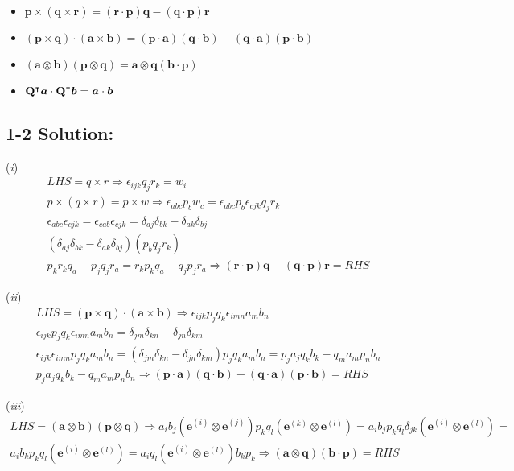 \begin{itemize}
    \item $\bm{p} \times (\bm{q} \times \bm{r}) = (\bm{r} \cdot \bm{p}) \bm{q} - (\bm{q} \cdot \bm{p}) \bm{r}$
    \item $(\bm{p} \times \bm{q}) \cdot (\bm{a} \times \bm{b}) = (\bm{p} \cdot \bm{a}) (\bm{q} \cdot \bm{b}) - (\bm{q} \cdot \bm{a})(\bm{p} \cdot \bm{b})$
    \item $(\bm{a} \otimes \bm{b})(\bm{p} \otimes \bm{q}) = \bm{a}\otimes\bm{q}(\bm{b} \cdot \bm{p}) $
    \item $\mathbf{Q}^\intercal\bm{a} \cdot \mathbf{Q}^\intercal\bm{b} = \bm{a}\cdot\bm{b} $
\end{itemize}

\subsection*{\textbf{1-2 Solution:}}
(\textit{i}) \begin{gather*}
    LHS =q\times r \Rightarrow \epsilon_{ijk}q_jr_k=w_i\\
    p\times(q\times r)=p\times w \Rightarrow\epsilon_{abc}p_bw_c=\epsilon_{abc}p_b\epsilon_{cjk}q_j r_k \\
    \epsilon_{abc}\epsilon_{cjk}=\epsilon_{cab}\epsilon_{cjk}=\delta_{aj}\delta_{bk}-\delta_{ak}\delta_{bj}\\
    (\delta_{aj}\delta_{bk}-\delta_{ak}\delta_{bj})(p_b q_j r_k)\\
    p_k r_k q_a - p_j q_j r_a = r_k p_k q_a - q_j p_j r_a \Rightarrow (\bm{r}\cdot\bm{p})\bm{q}-(\bm{q}\cdot\bm{p})\bm{r} = RHS
\end{gather*}

\medskip
(\textit{ii})\begin{gather*}
    LHS=(\bm{p} \times \bm{q}) \cdot (\bm{a} \times \bm{b})\Rightarrow\epsilon_{ijk}p_j q_k \epsilon_{imn}a_m b_n\\
    \epsilon_{ijk}p_j q_k \epsilon_{imn}a_m b_n=\delta_{jm}\delta_{kn}-\delta_{jn}\delta_{km}\\
    \epsilon_{ijk} \epsilon_{imn}p_j q_k a_m b_n=(\delta_{jm}\delta_{kn}-\delta_{jn}\delta_{km})p_j q_k a_m b_n=p_ja_jq_kb_k-q_ma_mp_nb_n\\
    p_ja_jq_kb_k-q_ma_mp_nb_n \Rightarrow (\bm{p} \cdot \bm{a}) (\bm{q} \cdot \bm{b}) - (\bm{q} \cdot \bm{a})(\bm{p} \cdot \bm{b})=RHS
\end{gather*}

\medskip
(\textit{iii})\begin{gather*}
    LHS = (\bm{a} \otimes \bm{b})(\bm{p} \otimes \bm{q}) \Rightarrow a_i b_j (\bm{e}^{(i)}\otimes\bm{e}^{(j)})p_k q_l (\bm{e}^{(k)}\otimes\bm{e}^{(l)})=a_i b_j p_k q_l \delta_{jk}(\bm{e}^{(i)}\otimes\bm{e}^{(l)})=\\
    a_i b_k p_k q_l (\bm{e}^{(i)}\otimes\bm{e}^{(l)})=a_i q_l (\bm{e}^{(i)}\otimes\bm{e}^{(l)}) b_k p_k \Rightarrow (\bm{a}\otimes\bm{q})(\bm{b} \cdot \bm{p})=RHS
\end{gather*}

